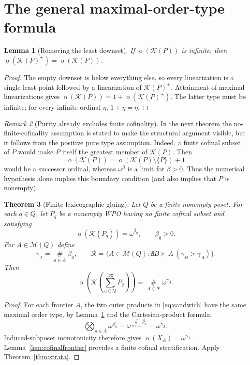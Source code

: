 \documentclass[11pt,a4paper]{article}
\newtheorem{theorem}{Theorem}[section]
\newtheorem{lemma}[theorem]{Lemma}
\theoremstyle{definition}
\theoremstyle{remark}
\newtheorem{remark}[theorem]{Remark}
\newcommand{\K}{\mathcal K}
\newcommand{\M}{\mathcal M}
\newcommand{\ot}{\operatorname{o}}
\newcommand{\bigns}{\mathop{\#}\limits}
\newcommand{\lxs}{\mathop{\sum}\limits^{\mathrm{lex}}}
\newcommand{\cR}{\mathcal R}
\begin{document}
\section{The general maximal-order-type formula}\label{sec:general}

\begin{lemma}[Removing the least downset]\label{lem:removebottom}
If $\ot(\K(P))$ is infinite, then
$\ot(\K(P)^+)=\ot(\K(P))$.
\end{lemma}

\begin{proof}
The empty downset is below everything else, so every linearization is a
single least point followed by a linearization of $\K(P)^+$. Attainment
of maximal linearizations gives
$\ot(\K(P))=1+\ot(\K(P)^+)$. The latter type must be infinite; for every
infinite ordinal $\eta$, $1+\eta=\eta$.
\end{proof}

\begin{remark}[Purity already excludes finite cofinality]
In the next theorem the no-finite-cofinality assumption is stated to make
the structural argument visible, but it follows from the positive pure
type assumption. Indeed, a finite cofinal subset of $P$ would make $P$
itself the greatest member of $\K(P)$. Then
\[
 \ot(\K(P))=\ot(\K(P)\setminus\{P\})+1
\]
would be a successor ordinal, whereas $\omega^\beta$ is a limit for
$\beta>0$. Thus the numerical hypothesis alone implies this boundary
condition (and also implies that $P$ is nonempty).
\end{remark}

\begin{samepage}
\begin{theorem}[Finite lexicographic gluing]\label{thm:general}
Let $Q$ be a finite nonempty poset. For each $q\in Q$, let $P_q$ be a
nonempty WPO having no finite cofinal subset and satisfying
\[
 \ot(\K(P_q))=\omega^{\beta_q},\qquad \beta_q>0.
\]
For $A\in\M(Q)$ define
\[
 \gamma_A=\bigns_{a\in A}\beta_a,
 \qquad
 \cR=\{A\in\M(Q):\nexists B\succ A\ (\gamma_B>\gamma_A)\}.
\]
Then
\begin{equation}\label{eq:main}
 \boxed{\displaystyle
 \ot\left(\K\left(\lxs_{q\in Q}P_q\right)\right)
   =\bigns_{A\in\cR}\omega^{\gamma_A}.}
\end{equation}
\end{theorem}
\end{samepage}

\begin{proof}
For each frontier $A$, the two outer products in \eqref{eq:sandwich} have
the same maximal order type, by Lemma~\ref{lem:removebottom} and the
Cartesian-product formula:
\[
 \mathop{\bigotimes}_{a\in A}\omega^{\beta_a}
   =\omega^{\bigns_{a\in A}\beta_a}=\omega^{\gamma_A}.
\]
Induced-subposet monotonicity therefore gives
$\ot(X_A)=\omega^{\gamma_A}$. Lemma~\ref{lem:cofinalfrontier} provides a
finite cofinal stratification. Apply Theorem~\ref{thm:strata}.
\end{proof}
\end{document}
